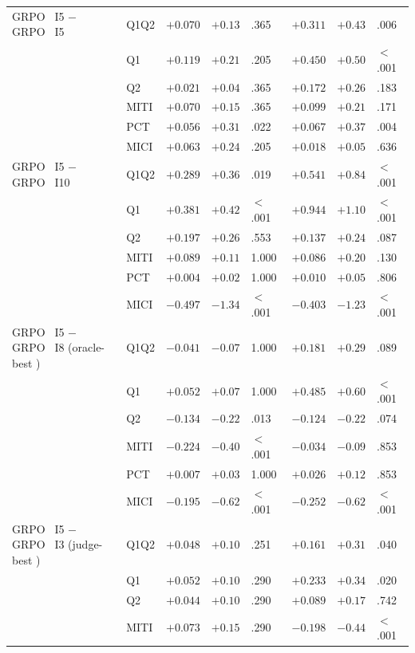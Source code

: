 \begin{table}[t]
\begin{tabular}{@{}l l rrl rrl@{}}
\addlinespace[2pt]
GRPO~\Kf{} I5 $-$ GRPO~\Kz{} I5 & Q1Q2 & $+0.070$ & $+0.13$ & .365 & $+0.311$ & $+0.43$ & .006 \\
 & Q1 & $+0.119$ & $+0.21$ & .205 & $+0.450$ & $+0.50$ & $<$.001 \\
 & Q2 & $+0.021$ & $+0.04$ & .365 & $+0.172$ & $+0.26$ & .183 \\
 & MITI & $+0.070$ & $+0.15$ & .365 & $+0.099$ & $+0.21$ & .171 \\
 & PCT & $+0.056$ & $+0.31$ & .022 & $+0.067$ & $+0.37$ & .004 \\
 & MICI & $+0.063$ & $+0.24$ & .205 & $+0.018$ & $+0.05$ & .636 \\
\addlinespace[2pt]
GRPO~\Kf{} I5 $-$ GRPO~\Kz{} I10 & Q1Q2 & $+0.289$ & $+0.36$ & .019 & $+0.541$ & $+0.84$ & $<$.001 \\
 & Q1 & $+0.381$ & $+0.42$ & $<$.001 & $+0.944$ & $+1.10$ & $<$.001 \\
 & Q2 & $+0.197$ & $+0.26$ & .553 & $+0.137$ & $+0.24$ & .087 \\
 & MITI & $+0.089$ & $+0.11$ & 1.000 & $+0.086$ & $+0.20$ & .130 \\
 & PCT & $+0.004$ & $+0.02$ & 1.000 & $+0.010$ & $+0.05$ & .806 \\
 & MICI & $-0.497$ & $-1.34$ & $<$.001 & $-0.403$ & $-1.23$ & $<$.001 \\
\addlinespace[2pt]
GRPO~\Kf{} I5 $-$ GRPO~\Kz{} I8 (oracle-best \Kz{}) & Q1Q2 & $-0.041$ & $-0.07$ & 1.000 & $+0.181$ & $+0.29$ & .089 \\
 & Q1 & $+0.052$ & $+0.07$ & 1.000 & $+0.485$ & $+0.60$ & $<$.001 \\
 & Q2 & $-0.134$ & $-0.22$ & .013 & $-0.124$ & $-0.22$ & .074 \\
 & MITI & $-0.224$ & $-0.40$ & $<$.001 & $-0.034$ & $-0.09$ & .853 \\
 & PCT & $+0.007$ & $+0.03$ & 1.000 & $+0.026$ & $+0.12$ & .853 \\
 & MICI & $-0.195$ & $-0.62$ & $<$.001 & $-0.252$ & $-0.62$ & $<$.001 \\
\addlinespace[2pt]
GRPO~\Kf{} I5 $-$ GRPO~\Kz{} I3 (judge-best \Kz{}) & Q1Q2 & $+0.048$ & $+0.10$ & .251 & $+0.161$ & $+0.31$ & .040 \\
 & Q1 & $+0.052$ & $+0.10$ & .290 & $+0.233$ & $+0.34$ & .020 \\
 & Q2 & $+0.044$ & $+0.10$ & .290 & $+0.089$ & $+0.17$ & .742 \\
 & MITI & $+0.073$ & $+0.15$ & .290 & $-0.198$ & $-0.44$ & $<$.001 \\

\end{tabular}
\end{table}
